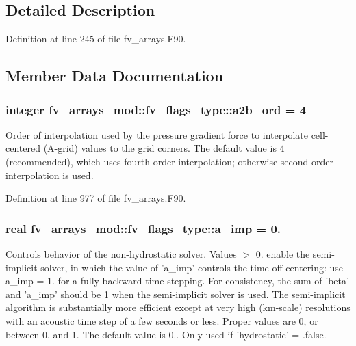 \subsection{Detailed Description}


Definition at line 245 of file fv\-\_\-arrays.\-F90.



\subsection{Member Data Documentation}
\subsubsection[{a2b\-\_\-ord}]{\setlength{\rightskip}{0pt plus 5cm}integer fv\-\_\-arrays\-\_\-mod\-::fv\-\_\-flags\-\_\-type\-::a2b\-\_\-ord = 4}\label{structfv__arrays__mod_1_1fv__flags__type_a0a9a9ada154a790c93d1f76bee1b7063}


Order of interpolation used by the pressure gradient force to interpolate cell-\/centered (A-\/grid) values to the grid corners. The default value is 4 (recommended), which uses fourth-\/order interpolation; otherwise second-\/order interpolation is used. 



Definition at line 977 of file fv\-\_\-arrays.\-F90.

\subsubsection[{a\-\_\-imp}]{\setlength{\rightskip}{0pt plus 5cm}real fv\-\_\-arrays\-\_\-mod\-::fv\-\_\-flags\-\_\-type\-::a\-\_\-imp = 0.}\label{structfv__arrays__mod_1_1fv__flags__type_a39331eb4717e02a2426b7aeefdcb46c6}


Controls behavior of the non-\/hydrostatic solver. Values $>$ 0. enable the semi-\/implicit solver, in which the value of 'a\-\_\-imp' controls the time-\/off-\/centering\-: use a\-\_\-imp = 1. for a fully backward time stepping. For consistency, the sum of 'beta' and 'a\-\_\-imp' should be 1 when the semi-\/implicit solver is used. The semi-\/implicit algorithm is substantially more efficient except at very high (km-\/scale) resolutions with an acoustic time step of a few seconds or less. Proper values are 0, or between 0. and 1. The default value is 0.. Only used if 'hydrostatic' = .false. 



